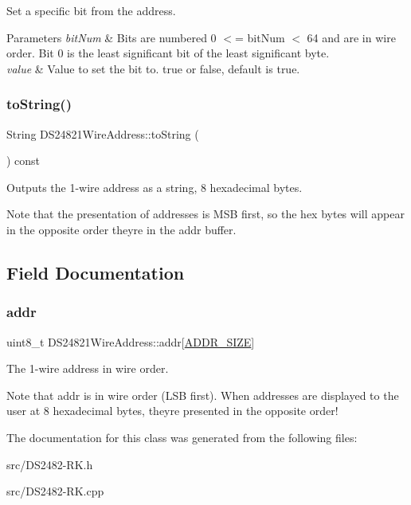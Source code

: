 Set a specific bit from the address. 


\begin{DoxyParams}{Parameters}
{\em bit\+Num} & Bits are numbered 0 $<$= bit\+Num $<$ 64 and are in wire order. Bit 0 is the least significant bit of the least significant byte.\\
\hline
{\em value} & Value to set the bit to. true or false, default is true. \\
\hline
\end{DoxyParams}
\mbox{\label{class_d_s24821_wire_address_a3a2dada65da76880cf47df392273a093}} 
\subsubsection{\texorpdfstring{to\+String()}{toString()}}
{\footnotesize\ttfamily String D\+S24821\+Wire\+Address\+::to\+String (\begin{DoxyParamCaption}{ }\end{DoxyParamCaption}) const}



Outputs the 1-\/wire address as a string, 8 hexadecimal bytes. 

Note that the presentation of addresses is M\+SB first, so the hex bytes will appear in the opposite order they\textquotesingle{}re in the addr buffer. 

\subsection{Field Documentation}
\mbox{\label{class_d_s24821_wire_address_af08b86e9765fd101648f0410cfa77378}} 
\subsubsection{\texorpdfstring{addr}{addr}}
{\footnotesize\ttfamily uint8\+\_\+t D\+S24821\+Wire\+Address\+::addr\mbox{[}\mbox{\hyperlink{class_d_s24821_wire_address_a49a60d299efb0f3c17f55f3dededfcdc}{A\+D\+D\+R\+\_\+\+S\+I\+ZE}}\mbox{]}\hspace{0.3cm}{\ttfamily [protected]}}



The 1-\/wire address in wire order. 

Note that addr is in wire order (L\+SB first). When addresses are displayed to the user at 8 hexadecimal bytes, they\textquotesingle{}re presented in the opposite order! 

The documentation for this class was generated from the following files\+:\begin{DoxyCompactItemize}
\item 
src/D\+S2482-\/\+R\+K.\+h\item 
src/D\+S2482-\/\+R\+K.\+cpp\end{DoxyCompactItemize}
